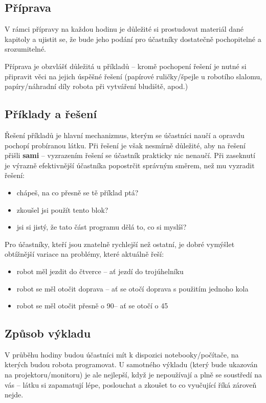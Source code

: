 \subsection{Příprava}
V rámci přípravy na každou hodinu je důležité si prostudovat materiál dané kapitoly a ujistit se, že bude jeho podání pro účastníky dostatečně pochopitelné a srozumitelné.

Příprava je obzvlášť důležitá u příkladů -- kromě pochopení řešení je nutné si připravit věci na jejich úspěšné řešení (papírové ruličky/špejle u robotího slalomu, papíry/náhradní díly robota při vytváření bludiště, apod.)

\subsection{Příklady a řešení}
Řešení příkladů je hlavní mechanizmus, kterým se účastníci naučí a opravdu pochopí probíranou látku. Při řešení je však nesmírně důležité, aby na řešení přišli \textbf{sami} -- vyzrazením řešení se účastník prakticky nic nenaučí. Při zaseknutí je výrazně efektivnější účastníka popostrčit správným směrem, než mu vyzradit řešení:
\begin{itemize}
	\item chápeš, na co přesně se tě příklad ptá?
	\item zkoušel jsi použít tento blok?
	\item jsi si jistý, že tato část programu dělá to, co si myslíš?
\end{itemize}

\vspace{\baselineskip}

Pro účastníky, kteří jsou znatelně rychlejší než ostatní, je dobré vymýšlet obtížnější variace na problémy, které aktuálně řeší:
\begin{itemize}
	\item robot měl jezdit do čtverce -- ať jezdí do trojúhelníku
	\item robot se měl otočit doprava -- ať se otočí doprava s použitím jednoho kola
	\item robot se měl otočit přesně o 90\degree -- ať se otočí o 45\degree
\end{itemize}

\subsection{Způsob výkladu}
V průběhu hodiny budou účastníci mít k dispozici notebooky/počítače, na kterých budou robota programovat. U samotného výkladu (který bude ukazován na projektoru/monitoru) je ale nejlepší, když je nepoužívají a plně se soustředí na vás -- látku si zapamatují lépe, poslouchat a zkoušet to co vyučující říká zároveň nejde.

